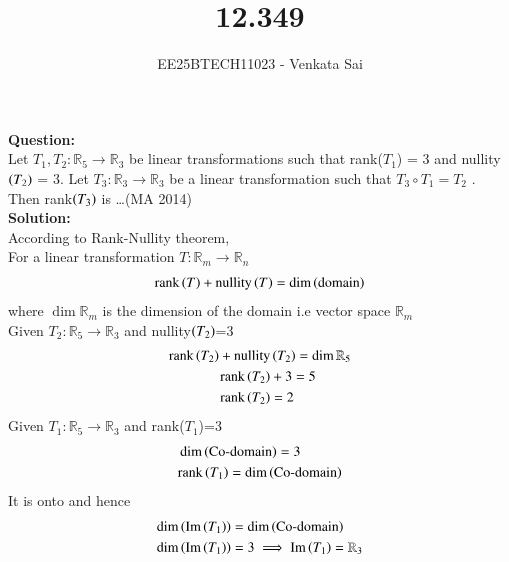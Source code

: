 \documentclass[journal]{IEEEtran}
\begin{document}


\title{12.349}
\author{EE25BTECH11023 - Venkata Sai}
\maketitle 
\renewcommand{\thefigure}{\theenumi}
\renewcommand{\thetable}{\theenumi}
\setlength{\intextsep}{10pt} %

\renewcommand{\thetable}{\theenumi}
\vspace{-1em}
\textbf{Question:}  \\
Let $T_1 , T_2 : \mathbb{R}_5 \rightarrow \mathbb{R}_3 $ be linear transformations such that rank($T_1$) = 3 and
nullity$\left(T_2\right)$ = 3. Let $T_3 : \mathbb{R}_3 \rightarrow \mathbb{R}_3$ be a linear transformation such that $T_3 \circ T_1 = T_2$ .
Then rank$\left(T_3\right)$ is \dots \hfill (MA 2014) \\
\textbf{Solution:}  \\
According to Rank-Nullity theorem,\\
For a linear transformation $T : \mathbb{R}_m \rightarrow \mathbb{R}_n $
\begin{align}
    \text{rank}\left(T\right)+\text{nullity}\left(T\right)=\dim\left(\text{domain}\right)
\end{align}
where $\dim\mathbb{R}_m $ is the dimension of the domain i.e vector space $\mathbb{R}_m $ \\ \newline
Given $T_2 : \mathbb{R}_5 \rightarrow \mathbb{R}_3 $ and nullity$\left(T_2\right)$=3 
\begin{align}
    \text{rank}\left(T_2\right)+\text{nullity}&\left(T_2\right)=\dim\mathbb{R}_5 \\
    \text{rank}\left(T_2\right)&+3=5 \\
    \text{rank}\left(T_2\right) &= 2
\end{align}
Given $T_1 : \mathbb{R}_5 \rightarrow \mathbb{R}_3 $ and rank($T_1$)=3
\begin{align}
    &\dim\left(\text{Co-domain}\right) =3 \\
    &\text{rank}\left(T_1\right)=\dim\left(\text{Co-domain}\right) 
\end{align}
It is onto and hence
\begin{align}
   \dim\left(\text{Im}\left(T_1\right)\right)&= \dim\left(\text{Co-domain}\right) \\
   \dim\left(\text{Im}\left(T_1\right)\right)&= 3 \implies \text{Im}\left(T_1\right)=\mathbb{R}_3
\end{align}
\end{document}
